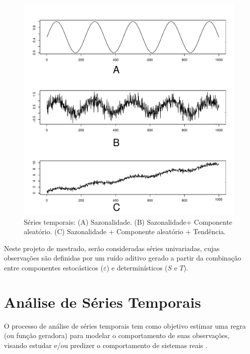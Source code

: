 \begin{figure}[!ht]
\begin{center}
  \includegraphics[scale=0.5]{seri7.pdf}
\caption{Séries temporais: (A) Sazonalidade. (B) Sazonalidade+ Componente aleatório. (C) Sazonalidade + Componente aleatório + Tendência.}
\label{seri}
\end{center}
\end{figure}


Neste projeto de mestrado, serão consideradas séries univariadas, cujas observações são definidas por um ruído aditivo gerado a partir da combinação entre componentes estocásticos ($\varepsilon$) e determinísticos ($S$ e $T$).

\section{Análise de Séries Temporais}

O processo de análise de séries temporais tem como objetivo estimar uma regra (ou função geradora) para modelar o comportamento de suas observações, visando estudar e/ou predizer o comportamento de sistemas reais \cite{box2015, shum2006}. 

